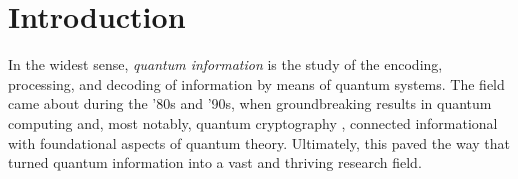 \chapter*{Introduction}
\label{chap:introduction}

In the widest sense, \emph{quantum information} is the study of the encoding, processing, and decoding of information by means of quantum systems. The field came about during the '80s and '90s, when groundbreaking results in quantum computing \cite{feynman2018simulating,shor1999polynomial} and, most notably, quantum cryptography \cite{bb84,ekert91}, connected informational with foundational aspects of quantum theory. Ultimately, this paved the way that turned quantum information into a vast and thriving research field.

